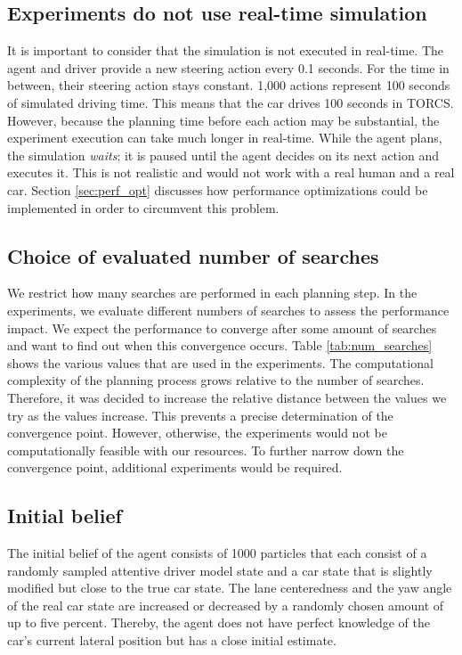 \subsection{Experiments do not use real-time simulation}

It is important to consider that the simulation is not executed in real-time. The agent and driver provide a new steering action every 0.1 seconds. For the time in between, their steering action stays constant. 1,000 actions represent 100 seconds of simulated driving time. This means that the car drives 100 seconds in TORCS. However, because the planning time before each action may be substantial, the experiment execution can take much longer in real-time. While the agent plans, the simulation \emph{waits}; it is paused until the agent decides on its next action and executes it. This is not realistic and would not work with a real human and a real car. Section \ref{sec:perf_opt} discusses how performance optimizations could be implemented in order to circumvent this problem. 

\subsection{Choice of evaluated number of searches}

 

We restrict how many searches are performed in each planning step. In the experiments, we evaluate different numbers of searches to assess the performance impact. We expect the performance to converge after some amount of searches and want to find out when this convergence occurs. Table \ref{tab:num_searches} shows the various values that are used in the experiments. The computational complexity of the planning process grows relative to the number of searches. Therefore, it was decided to increase the relative distance between the values we try as the values increase. This prevents a precise determination of the convergence point. However, otherwise, the experiments would not be computationally feasible with our resources. To further narrow down the convergence point, additional experiments would be required.

\subsection{Initial belief}

The initial belief of the agent consists of 1000 particles that each consist of a randomly sampled attentive driver model state and a car state that is slightly modified but close to the true car state. The lane centeredness and the yaw angle of the real car state are increased or decreased by a randomly chosen amount of up to five percent. Thereby, the agent does not have perfect knowledge of the car's current lateral position but has a close initial estimate.

